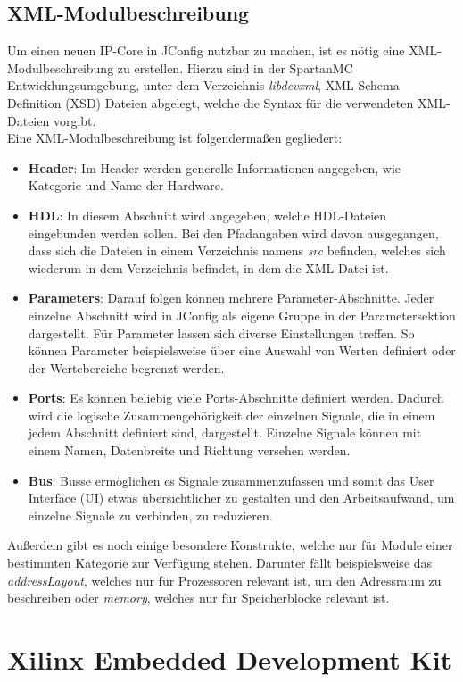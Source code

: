 \subsection{XML-Modulbeschreibung} \label{subsec:xml}
Um einen neuen IP-Core in JConfig nutzbar zu machen, ist es nötig eine XML-Modulbeschreibung zu erstellen. Hierzu sind in der SpartanMC Entwicklungsumgebung, unter dem Verzeichnis \textit{libdevxml}, XML Schema Definition (XSD) Dateien abgelegt, welche die Syntax für die verwendeten XML-Dateien
vorgibt.\\
Eine XML-Modulbeschreibung ist folgendermaßen gegliedert:
\begin{itemize}
\item \textbf{Header}: Im Header werden generelle Informationen angegeben, wie Kategorie und Name der Hardware.
\item \textbf{HDL}: In diesem Abschnitt wird angegeben, welche HDL-Dateien eingebunden werden sollen. Bei den Pfadangaben wird davon ausgegangen, dass sich die Dateien in einem Verzeichnis namens \textit{src} befinden, welches sich wiederum in dem Verzeichnis befindet, in dem die XML-Datei ist.
\item \textbf{Parameters}: Darauf folgen können mehrere Parameter-Abschnitte. Jeder einzelne Abschnitt wird in JConfig als eigene Gruppe in der Parametersektion dargestellt. Für Parameter lassen sich diverse Einstellungen treffen. So können Parameter beispielsweise über eine Auswahl von Werten definiert oder der Wertebereiche begrenzt werden.
\item \textbf{Ports}: Es können beliebig viele Ports-Abschnitte definiert werden. Dadurch wird die logische Zusammengehörigkeit der einzelnen Signale, die in einem jedem Abschnitt definiert sind, dargestellt. Einzelne Signale können mit einem Namen, Datenbreite und Richtung versehen werden.
\item \textbf{Bus}: Busse ermöglichen es Signale zusammenzufassen und somit das User Interface (UI) etwas übersichtlicher zu gestalten und den Arbeitsaufwand, um einzelne Signale zu verbinden, zu reduzieren.
\end{itemize} 
Außerdem gibt es noch einige besondere Konstrukte, welche nur für Module einer bestimmten Kategorie zur Verfügung stehen. Darunter fällt beispielsweise das \textit{addressLayout}, welches nur für Prozessoren relevant ist, um den Adressraum zu beschreiben oder \textit{memory}, welches nur für Speicherblöcke relevant ist.

\section{Xilinx Embedded Development Kit}

